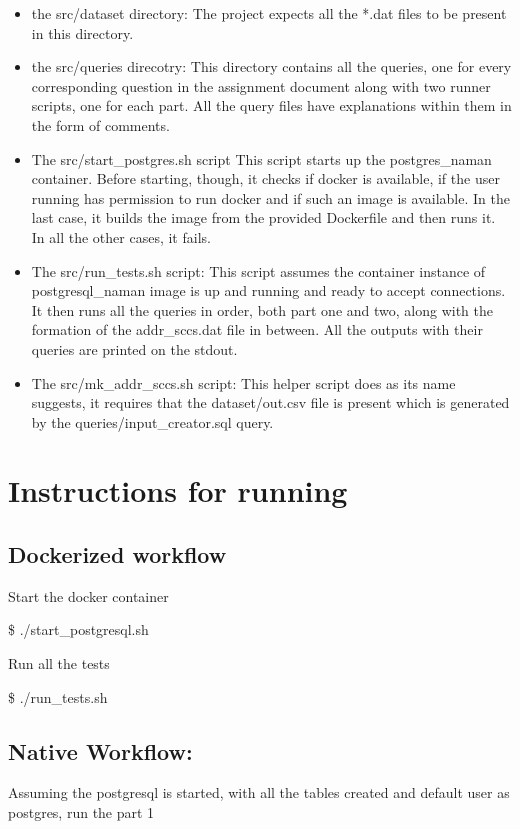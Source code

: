 \documentclass[conference,a4paper,12pt]{IEEEtran}
\begin{document}
	\begin{itemize}
		\item{the src/dataset directory:}
		The project expects all the *.dat files to be present in this directory.
		\item{the src/queries direcotry:}
		This directory contains all the queries, one for every corresponding question in the assignment document along with two runner scripts, one for each part. All the query files have explanations within them in the form of comments.
		\item{The src/start\_postgres.sh script}
		This script starts up the postgres\_naman container. Before starting, though, it checks if docker is available, if the user running has permission to run docker and if such an image is available. In the last case, it builds the image from the provided Dockerfile and then runs it. In all the other cases, it fails.
		\item{The src/run\_tests.sh script:}
		This script assumes the container instance of postgresql\_naman image is up and running and ready to accept connections. It then runs all the queries in order, both part one and two, along with the formation of the addr\_sccs.dat file in between. All the outputs with their queries are printed on the stdout.
		\item{The src/mk\_addr\_sccs.sh script:}
		This helper script does as its name suggests, it requires that the dataset/out.csv file is present which is generated by the queries/input\_creator.sql query.
		
	\end{itemize}

\section{Instructions for running}
	\subsection{Dockerized workflow}
	Start the docker container
	
	\$ ./start\_postgresql.sh

	Run all the tests
		
	\$ ./run\_tests.sh
	
	
	\subsection{Native Workflow:}
	Assuming the postgresql is started, with all the tables created and default user as postgres,
	run the part 1
	
\end{document}
